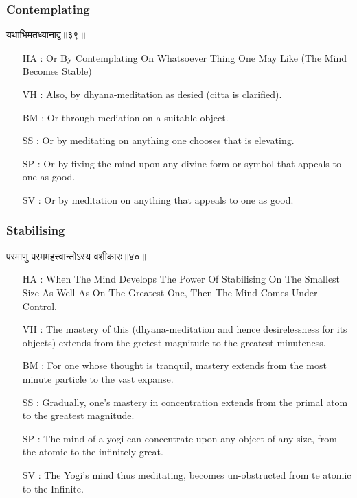 \begin{frame}[fragile]\frametitle{Contemplating}
\begin{sanskrit}
यथाभिमतध्यानाद्व॥३९॥
\end{sanskrit}

	\begin{itemize}
	\item [HA]: Or By Contemplating On Whatsoever Thing One May Like (The Mind Becomes Stable)
	\item [VH]: Also, by dhyana-meditation as desied (citta is clarified).
	\item [BM]: Or through mediation on a suitable object.
	\item [SS]: Or by meditating on anything one chooses that is elevating.
	\item [SP]: Or by fixing the mind upon any divine form or symbol that appeals to one as good.
	\item [SV]: Or by meditation on anything that appeals to one as good. 
	\end{itemize}
\end{frame}




\begin{frame}[fragile]\frametitle{Stabilising}
\begin{sanskrit}
परमाणु परममहत्त्वान्तोऽस्य वशीकारः॥४०॥
\end{sanskrit}

	\begin{itemize}
	\item [HA]: When The Mind Develops The Power Of Stabilising On The Smallest Size As Well As On The Greatest One, Then The Mind Comes Under Control.
	\item [VH]: The mastery of this (dhyana-meditation and hence desirelessness for its objects) extends from the gretest magnitude to the greatest minuteness.
	\item [BM]: For one whose thought is tranquil, mastery extends from the most minute particle to the vast expanse.
	\item [SS]: Gradually, one’s mastery in concentration extends from the primal atom to the greatest magnitude.
	\item [SP]: The mind of a yogi can concentrate upon any object of any size, from the atomic to the infinitely great.
	\item [SV]: The Yogi’s mind thus meditating, becomes un-obstructed from te atomic to the Infinite. 
	\end{itemize}
\end{frame}

